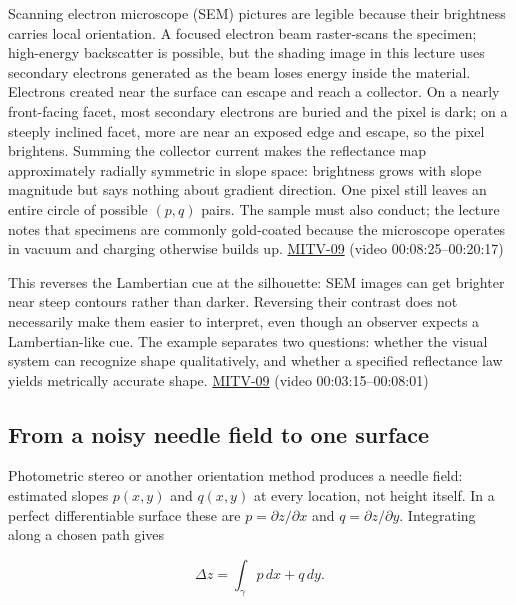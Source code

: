 Scanning electron microscope (SEM) pictures are legible because their brightness carries local orientation. A focused electron beam raster-scans the specimen; high-energy backscatter is possible, but the shading image in this lecture uses secondary electrons generated as the beam loses energy inside the material. Electrons created near the surface can escape and reach a collector. On a nearly front-facing facet, most secondary electrons are buried and the pixel is dark; on a steeply inclined facet, more are near an exposed edge and escape, so the pixel brightens. Summing the collector current makes the reflectance map approximately radially symmetric in slope space: brightness grows with slope magnitude but says nothing about gradient direction. One pixel still leaves an entire circle of possible \((p,q)\) pairs. The sample must also conduct; the lecture notes that specimens are commonly gold-coated because the microscope operates in vacuum and charging otherwise builds up. \hyperref[04-visual-computing-ii-ch036-mitv-09---shape-from-shading-general-case---from-first-order-nonlinear-pde-to-five-odes]{MITV-09} (video 00:08:25--00:20:17)

This reverses the Lambertian cue at the silhouette: SEM images can get brighter near steep contours rather than darker. Reversing their contrast does not necessarily make them easier to interpret, even though an observer expects a Lambertian-like cue. The example separates two questions: whether the visual system can recognize shape qualitatively, and whether a specified reflectance law yields metrically accurate shape. \hyperref[04-visual-computing-ii-ch036-mitv-09---shape-from-shading-general-case---from-first-order-nonlinear-pde-to-five-odes]{MITV-09} (video 00:03:15--00:08:01)

\subsection{From a noisy needle field to one surface}\label{04-visual-computing-ii-ch032-from-a-noisy-needle-field-to-one-surface}

Photometric stereo or another orientation method produces a needle field: estimated slopes \(p(x,y)\) and \(q(x,y)\) at every location, not height itself. In a perfect differentiable surface these are \(p=\partial z/\partial x\) and \(q=\partial z/\partial y\). Integrating along a chosen path gives

\[
\Delta z=\int_\gamma p\,dx+q\,dy.
\]

